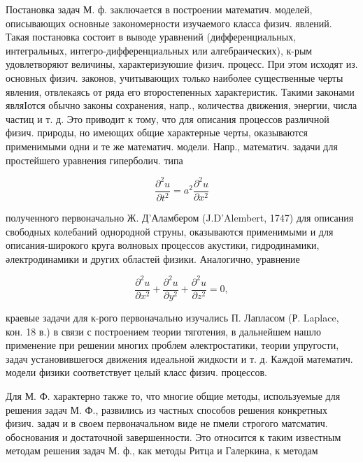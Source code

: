 \documentclass[10pt]{article}
\begin{document}
Постановка задач М. ф. заключается в построении математич. моделей, описывающих основные закономерности изучаемого класса физич. явлений. Такая постановка состоит в выводе уравнений (дифференциальных, интегральных, интегро-дифференциальных или алгебраических), к-рым удовлетворяют величины, характеризуюшие физич. процесс. При этом исходят из. основных физич. законов, учитывающих только наиболее существенные черты явления, отвлекаясь от ряда его второстепенных характеристик. Такими законами являІотся обычно законы сохранения, напр., количества движения, энергии, числа частиц и т. д. Это приводит к тому, что для описания процессов различной физич. природы, но имеющих общие характерные черты, оказываются применимыми одни и те же математич. модели. Напр., математич. задачи для простейшего уравнения гиперболич. типа



\[

\frac{\partial^{2} u}{\partial t^{2}}=a^{2} \frac{\partial^{2} u}{\partial x^{2}}

\]



полученного первоначально Ж. Д'Аламбером (J.D'Alembert, 1747) для описания свободных колебаний однородной струны, оказываются применимыми и для описания-широкого круга волновых процессов акустики, гидродинамики, әлектродинамики и других областей физики. Аналогично, уравнение



\[

\frac{\partial^{2} u}{\partial x^{2}}+\frac{\partial^{2} u}{\partial y^{2}}+\frac{\partial^{2} u}{\partial z^{2}}=0,

\]



краевые задачи для к-рого первоначально изучались П. Лапласом (Р. Laplace, кон. 18 в.) в связи с построением теории тяготения, в дальнейшем нашло применение при решении многих проблем әлектростатики, теории упругости, задач установившегося движения идеальной жидкости и т. д. Каждой математич. модели физики соответствует целый класс физич. процессов.



Для М. Ф. характерно также то, что многие общие методы, используемые для решения задач М. Ф., развились из частных способов решения конкретных физич. задач и в своем первоначальном виде не пмели строгого матсматич. обоснования и достаточной завершенности. Это относится к таким известным методам решения задач М. ф., как методы Ритца и Галеркина, к методам
\end{document}
